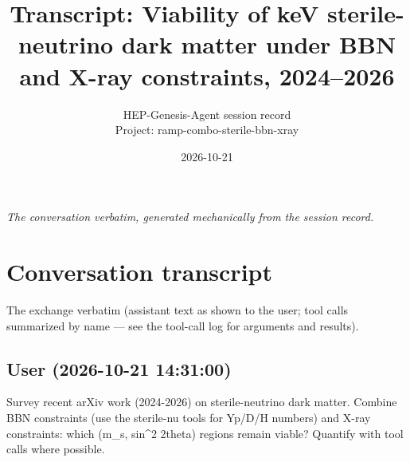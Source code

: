 \documentclass[11pt,a4paper]{article}
\title{Transcript: Viability of keV sterile-neutrino dark matter under BBN and X-ray constraints, 2024--2026}
\author{HEP-Genesis-Agent session record \\ \small Project: ramp-combo-sterile-bbn-xray}
\date{2026-10-21}
\begin{document}
\maketitle
\noindent\textit{\small The conversation verbatim, generated mechanically from the session record.}
\vspace{1em}



\appendix
\section{Conversation transcript}
\label{app:transcript}
The exchange verbatim (assistant text as shown to the user; tool calls summarized by name --- see the tool-call log for arguments and results).
\subsection*{User \small(2026-10-21 14:31:00)}
Survey recent arXiv work (2024-2026) on sterile-neutrino dark matter. Combine BBN constraints (use the sterile-nu tools for Yp/D/H numbers) and X-ray constraints: which (m\_s, sin\textasciicircum{}2 2theta) regions remain viable? Quantify with tool calls where possible.
\end{document}
